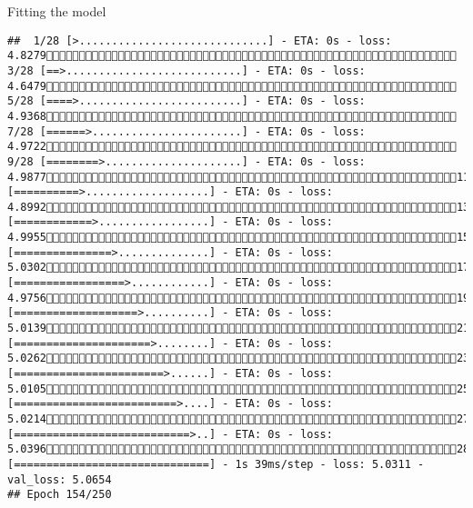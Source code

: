 \documentclass[
  ignorenonframetext,
]{beamer}
\begin{document}
\begin{frame}[fragile]{Fitting the model}
\begin{verbatim}
##  1/28 [>.............................] - ETA: 0s - loss: 4.8279 3/28 [==>...........................] - ETA: 0s - loss: 4.6479 5/28 [====>.........................] - ETA: 0s - loss: 4.9368 7/28 [======>.......................] - ETA: 0s - loss: 4.9722 9/28 [========>.....................] - ETA: 0s - loss: 4.987711/28 [==========>...................] - ETA: 0s - loss: 4.899213/28 [============>.................] - ETA: 0s - loss: 4.995515/28 [===============>..............] - ETA: 0s - loss: 5.030217/28 [=================>............] - ETA: 0s - loss: 4.975619/28 [===================>..........] - ETA: 0s - loss: 5.013921/28 [=====================>........] - ETA: 0s - loss: 5.026223/28 [=======================>......] - ETA: 0s - loss: 5.010525/28 [=========================>....] - ETA: 0s - loss: 5.021427/28 [===========================>..] - ETA: 0s - loss: 5.039628/28 [==============================] - 1s 39ms/step - loss: 5.0311 - val_loss: 5.0654
## Epoch 154/250

\end{verbatim}
\end{frame}
\end{document}
